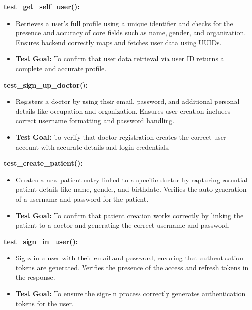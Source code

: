 \documentclass[12pt, titlepage]{article}
\begin{document}
\begin{enumerate}
\begin{enumerate}
\begin{enumerate}
\textbf{test\_get\_self\_user():}  
\begin{itemize}
    \item Retrieves a user's full profile using a unique identifier and checks for the presence and accuracy of core fields such as name, gender, and organization. Ensures backend correctly maps and fetches user data using UUIDs.
    \item \textbf{Test Goal:} To confirm that user data retrieval via user ID returns a complete and accurate profile. 
    \newline
\end{itemize}

\textbf{test\_sign\_up\_doctor():}  
\begin{itemize}
    \item Registers a doctor by using their email, password, and additional personal details like occupation and organization. Ensures user creation includes correct username formatting and password handling.
    \item \textbf{Test Goal:} To verify that doctor registration creates the correct user account with accurate details and login credentials. 
    \newline
\end{itemize}

\textbf{test\_create\_patient():}  
\begin{itemize}
    \item Creates a new patient entry linked to a specific doctor by capturing essential patient details like name, gender, and birthdate. Verifies the auto-generation of a username and password for the patient.
    \item \textbf{Test Goal:} To confirm that patient creation works correctly by linking the patient to a doctor and generating the correct username and password. 
    \newline
\end{itemize}

\textbf{test\_sign\_in\_user():}  
\begin{itemize}
    \item Signs in a user with their email and password, ensuring that authentication tokens are generated. Verifies the presence of the access and refresh tokens in the response.
    \item \textbf{Test Goal:} To ensure the sign-in process correctly generates authentication tokens for the user. 
    \newline
\end{itemize}


\end{enumerate}
\end{enumerate}
\end{enumerate}
\end{document}
